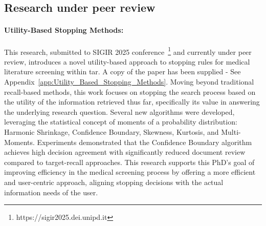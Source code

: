 \documentclass[10pt,oneside]{book}
\begin{document}
\subsection{Research under peer review}

\paragraph{Utility-Based Stopping Methods:}
This research, submitted to SIGIR 2025 conference~\footnote{https://sigir2025.dei.unipd.it} and currently under peer review, introduces a novel utility-based approach to stopping rules for medical literature screening within \gls*{tar}. A copy of the paper has been supplied - See Appendix~\ref{app:Utility_Based_Stopping_Methods}. Moving beyond traditional recall-based methods, this work focuses on stopping the search process based on the utility of the information retrieved thus far, specifically its value in answering the underlying research question. Several new algorithms were developed, leveraging the statistical concept of moments of a probability distribution: Harmonic Shrinkage, Confidence Boundary, Skewness, Kurtosis, and Multi-Moments. Experiments demonstrated that the Confidence Boundary algorithm achieves high decision agreement with significantly reduced document review compared to target-recall approaches. This research supports this PhD's goal of improving efficiency in the medical screening process by offering a more efficient and user-centric approach, aligning stopping decisions with the actual information needs of the user.
\end{document}
